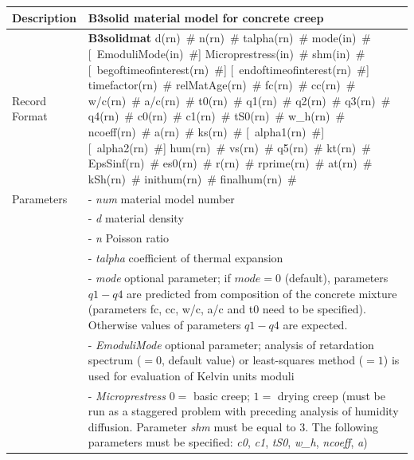 \documentclass[a4paper]{article}
\newcommand{\descitem}[1]{{\noindent \bf #1}}
\newcommand{\elemparam}[2]{{{#1\tiny (#2)}~\#}}
\newcommand{\optelemparam}[2]{[{~\elemparam{#1}{#2}}]}
\newcommand{\param}[1]{{\it #1}}
\newenvironment{mmt}{\begin{tabular}{|l|p{9cm}|}}{\end{tabular}\\}
\newenvironment{mmt}{\begin{tabular}{|l|l|}}{\end{tabular}\\}
\begin{document}
\begin{table}[!htb]
\begin{mmt}
\hline
Description & B3solid material model  for concrete creep\\
\hline
Record Format & \descitem{B3solidmat} 
\elemparam{d}{rn} \elemparam{n}{rn} \elemparam{talpha}{rn}
%
\elemparam{mode}{in} 
\optelemparam{EmoduliMode}{in} 
\elemparam{Microprestress}{in}
\elemparam{shm}{in} 
\optelemparam{begoftimeofinterest}{rn} \optelemparam{endoftimeofinterest}{rn} \elemparam{timefactor}{rn} \elemparam{relMatAge}{rn}
\elemparam{fc}{rn} \elemparam{cc}{rn} \elemparam{w/c}{rn} \elemparam{a/c}{rn} \elemparam{t0}{rn} %
\elemparam{q1}{rn} \elemparam{q2}{rn} \elemparam{q3}{rn} \elemparam{q4}{rn} %
%
\elemparam{c0}{rn} \elemparam{c1}{rn} \elemparam{tS0}{rn} %
\elemparam{w\_h}{rn} \elemparam{ncoeff}{rn} \elemparam{a}{rn}
%
\elemparam{ks}{rn} 
\optelemparam{alpha1}{rn} \optelemparam{alpha2}{rn} \elemparam{hum}{rn} \elemparam{vs}{rn}
\elemparam{q5}{rn} \elemparam{kt}{rn} \elemparam{EpsSinf}{rn}
\elemparam{es0}{rn} \elemparam{r}{rn} \elemparam{rprime}{rn} \elemparam{at}{rn}     
\elemparam{kSh}{rn}
\elemparam{inithum}{rn} \elemparam{finalhum}{rn}\\
%             
Parameters 
&- \param{num} material model number\\
&- \param{d} material density\\
&- \param{n} Poisson ratio\\
&- \param{talpha} coefficient of thermal expansion\\

&- \param{mode} optional parameter; if $mode = 0$ (default),  parameters $q1-q4$ are predicted from composition of the concrete mixture (parameters fc, cc, w/c, a/c and t0 need to be specified). Otherwise values of parameters $q1-q4$ are expected.\\
&- \param{EmoduliMode} optional parameter; analysis of retardation spectrum ($=0$, default value) or least-squares method ($=1$) is used for evaluation of Kelvin units moduli\\
&- \param{Microprestress} $0=$ basic creep; $1=$ drying creep (must be run as a staggered problem with preceding analysis of humidity diffusion. Parameter \param{shm} must be equal to 3. The following parameters must be specified: \param{c0}, \param{c1}, \param{tS0}, \param{w\_h}, \param{ncoeff}, \param{a})\\


\end{mmt}
\end{table}
\end{document}
